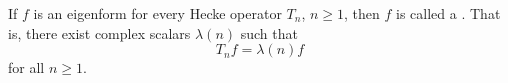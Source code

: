 If $f$ is an eigenform for every Hecke operator $T_n$, $n \geq 1$, then $f$ is called a . That is, there exist complex scalars $\lambda(n)$ such that
$$T_n f = \lambda(n) f$$
for all $n \geq 1$.
